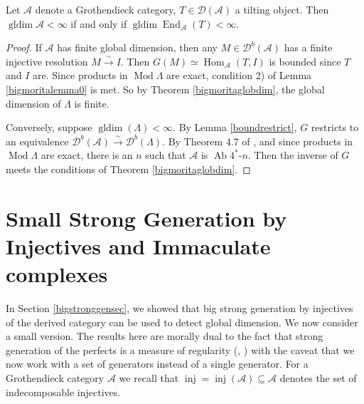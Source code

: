 \documentclass[12pt,oneside]{amsart}
\DeclareMathOperator{\Hom}{Hom}
\DeclareMathOperator{\End}{End}
\DeclareMathOperator{\Mod}{Mod}
\DeclareMathOperator{\gldim}{gldim}
\DeclareMathOperator{\inj}{inj}
\DeclareMathOperator{\Ab}{Ab}
\begin{document}
\begin{theorem} \label{tiltingglobdim}
Let $\mathcal{A}$ denote a Grothendieck category, $T \in \mathcal{D}(\mathcal{A})$ a tilting object. Then $\gldim \mathcal{A} < \infty$ if and only if $\gldim \End_\mathcal{A}(T) < \infty$. 
\end{theorem}

\begin{proof}
If $\mathcal{A}$ has finite global dimension, then any $M \in \mathcal{D}^b(\mathcal{A})$ has a finite injective resolution $M \xrightarrow{\sim} I$. Then $G(M) \simeq \Hom_{\mathcal{A}}(T,I)$ is bounded since $T$ and $I$ are. Since products in $\Mod \Lambda$ are exact, condition 2) of Lemma \ref{bigmoritalemma0} is met. So by Theorem \ref{bigmoritaglobdim}, the global dimension of $\Lambda$ is finite. 

Conversely, suppose $\gldim(\Lambda) < \infty$. By Lemma \ref{boundrestrict}, $G$ restricts to an equivalence $\mathcal{D}^b(\mathcal{A}) \xrightarrow{\sim} \mathcal{D}^b(\Lambda)$. By Theorem 4.7 of \cite{Pos26}, and since products in $\Mod \Lambda$ are exact, there is an $n$ such that $\mathcal{A}$ is $\Ab 4^\ast$-$n$. Then the inverse of $G$ meets the conditions of Theorem \ref{bigmoritaglobdim}. 
\end{proof}
































\section{Small Strong Generation by Injectives and Immaculate complexes}

\label{immacsec}

In Section \ref{bigstronggensec}, we showed that big strong generation by injectives of the derived category can be used to detect global dimension. We now consider a small version. The results here are morally dual to the fact that strong generation of the perfects is a measure of regularity (\cite[Theorem 3.14]{VB02}, \cite[Theorem 0.5]{Nee21b}) with the caveat that we now work with a set of generators instead of a single generator. For a Grothendieck category $\mathcal{A}$ we recall that $\inj = \inj(\mathcal{A}) \subseteq \mathcal{A}$ denotes the set of indecomposable injectives.
\end{document}
